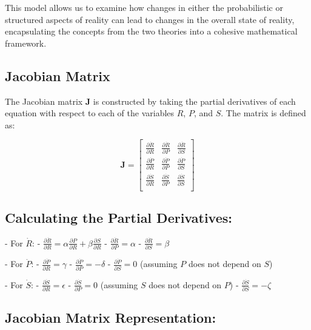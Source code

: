 \documentclass{article}
\begin{document}
This model allows us to examine how changes in either the probabilistic or structured aspects of reality can lead to changes in the overall state of reality, encapsulating the concepts from the two theories into a cohesive mathematical framework.
\subsection*{Jacobian Matrix}

The Jacobian matrix \(\mathbf{J}\) is constructed by taking the partial derivatives of each equation with respect to each of the variables \(R\), \(P\), and \(S\). The matrix is defined as:

\[
\mathbf{J} = \begin{bmatrix}
\frac{\partial \dot{R}}{\partial R} & \frac{\partial \dot{R}}{\partial P} & \frac{\partial \dot{R}}{\partial S} \\
\frac{\partial \dot{P}}{\partial R} & \frac{\partial \dot{P}}{\partial P} & \frac{\partial \dot{P}}{\partial S} \\
\frac{\partial \dot{S}}{\partial R} & \frac{\partial \dot{S}}{\partial P} & \frac{\partial \dot{S}}{\partial S} \\
\end{bmatrix}
\]

\subsection*{Calculating the Partial Derivatives:}

- For \(\dot{R}\):
  - \(\frac{\partial \dot{R}}{\partial R} = \alpha \frac{\partial P}{\partial R} + \beta \frac{\partial S}{\partial R}\)
  - \(\frac{\partial \dot{R}}{\partial P} = \alpha\)
  - \(\frac{\partial \dot{R}}{\partial S} = \beta\)

- For \(\dot{P}\):
  - \(\frac{\partial \dot{P}}{\partial R} = \gamma\)
  - \(\frac{\partial \dot{P}}{\partial P} = -\delta\)
  - \(\frac{\partial \dot{P}}{\partial S} = 0\) (assuming \(P\) does not depend on \(S\))

- For \(\dot{S}\):
  - \(\frac{\partial \dot{S}}{\partial R} = \epsilon\)
  - \(\frac{\partial \dot{S}}{\partial P} = 0\) (assuming \(S\) does not depend on \(P\))
  - \(\frac{\partial \dot{S}}{\partial S} = -\zeta\)

\subsection*{Jacobian Matrix Representation:}
\end{document}
